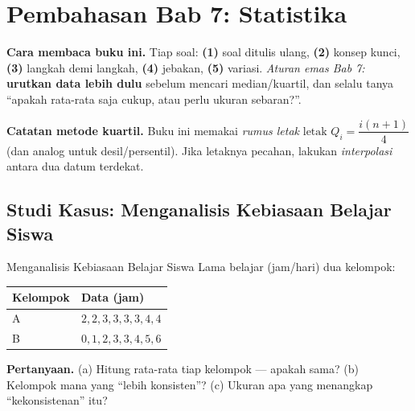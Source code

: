 
\renewcommand{\babjudul}{Pembahasan Latihan — Bab 7}


\setcounter{chapter}{7}

\chapter*{Pembahasan Bab 7: Statistika}

\begin{tips}
\textbf{Cara membaca buku ini.} Tiap soal: \textbf{(1)} soal ditulis ulang,
\textbf{(2)} konsep kunci, \textbf{(3)} langkah demi langkah, \textbf{(4)}
jebakan, \textbf{(5)} variasi. \emph{Aturan emas Bab 7:} \textbf{urutkan data
lebih dulu} sebelum mencari median/kuartil, dan selalu tanya ``apakah rata-rata
saja cukup, atau perlu ukuran sebaran?''.

\smallskip
\textbf{Catatan metode kuartil.} Buku ini memakai \emph{rumus letak}
$\text{letak }Q_i=\dfrac{i(n+1)}{4}$ (dan analog untuk desil/persentil). Jika
letaknya pecahan, lakukan \emph{interpolasi} antara dua datum terdekat.
\end{tips}

\section*{Studi Kasus: Menganalisis Kebiasaan Belajar Siswa}

\begin{studikasus}{Menganalisis Kebiasaan Belajar Siswa}
Lama belajar (jam/hari) dua kelompok:
\begin{center}
\begin{tabular}{l|l}
\toprule
Kelompok & Data (jam) \\ \midrule
A & $2,2,3,3,3,3,4,4$ \\
B & $0,1,2,3,3,4,5,6$ \\ \bottomrule
\end{tabular}
\end{center}
\textbf{Pertanyaan.} (a) Hitung rata-rata tiap kelompok --- apakah sama?
(b) Kelompok mana yang ``lebih konsisten''? (c) Ukuran apa yang menangkap
``kekonsistenan'' itu?
\end{studikasus}

